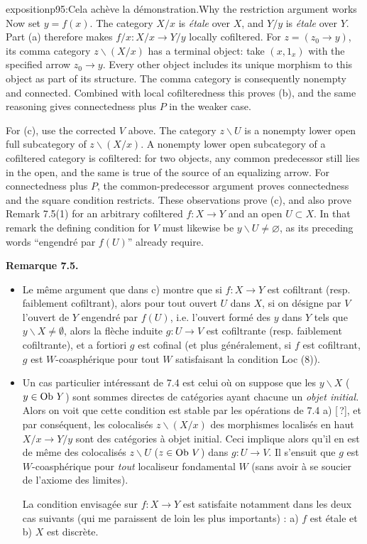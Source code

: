 \begin{dcomment}{exposition}{p95:Cela achève la démonstration.}{Why the restriction argument works}
Now set $y=f(x)$. The category $X/x$ is \emph{\'etale} over $X$, and $Y/y$ is \emph{\'etale} over $Y$. Part (a) therefore makes $f/x:X/x\to Y/y$ locally cofiltered. For $z=(z_0\to y)$, its comma category $z\backslash(X/x)$ has a terminal object: take $(x,1_x)$ with the specified arrow $z_0\to y$. Every other object includes its unique morphism to this object as part of its structure. The comma category is consequently nonempty and connected. Combined with local cofilteredness this proves (b), and the same reasoning gives connectedness plus $P$ in the weaker case.

For (c), use the corrected $V$ above. The category $z\backslash U$ is a nonempty lower open full subcategory of $z\backslash(X/x)$. A nonempty lower open subcategory of a cofiltered category is cofiltered: for two objects, any common predecessor still lies in the open, and the same is true of the source of an equalizing arrow. For connectedness plus $P$, the common-predecessor argument proves connectedness and the square condition restricts. These observations prove (c), and also prove Remark 7.5(1) for an arbitrary cofiltered $f:X\to Y$ and an open $U\subset X$. In that remark the defining condition for $V$ must likewise be $y\backslash U\ne\varnothing$, as its preceding words ``engendr\'e par $f(U)$'' already require.
\end{dcomment}


\noindent\textbf{Remarque 7.5.}
\begin{itemize}
\item[1)] Le même argument que dans c) montre que si $f : X \longrightarrow Y$ est cofiltrant (resp. faiblement cofiltrant), alors pour tout ouvert $U$ dans $X$, si on désigne par $V$ l'ouvert de $Y$ engendré par $f(U)$, i.e. l'ouvert formé des $y$ dans $Y$ tels que $y\backslash X \neq \emptyset$, alors la flèche induite $g : U \longrightarrow V$ est cofiltrante (resp. faiblement cofiltrante), et a fortiori $g$ est cofinal (et plus généralement, si $f$ est cofiltrant, $g$ est $W$-coasphérique pour tout $W$ satisfaisant la condition Loc (8)).

\item[2)] Un cas particulier intéressant de 7.4 est celui où on suppose que les $y\backslash X$ ($y \in \operatorname{Ob}\,Y$) sont sommes directes de catégories ayant chacune un \textit{objet initial.} Alors on voit que cette condition est stable par les opérations de 7.4 a) [\,?], et par conséquent, les colocalisés $z\backslash(X/x)$ des morphismes localisés en haut $X/x \longrightarrow Y/y$ sont des catégories à objet initial. Ceci implique alors qu'il en est de même des colocalisés $z\backslash U$ ($z \in \operatorname{Ob}\,V$) dans $g : U \longrightarrow V$. Il s'ensuit que $g$ est $W$-coasphérique pour \textit{tout} localiseur fondamental $W$ (sans avoir à se soucier de l'axiome des limites).

La condition envisagée sur $f : X \longrightarrow Y$ est satisfaite notamment dans les deux cas suivants (qui me paraissent de loin les plus importants) : a) $f$ est étale et b) $X$ est discrète.
\end{itemize}

